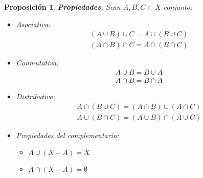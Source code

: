 \documentclass[10pt, a4paper]{article}
\theoremstyle{theorem-style}
\newtheorem{nprop}{Proposición}[section]
\theoremstyle{definition-style}
\theoremstyle{remark-style}
\theoremstyle{example-style}
\theoremstyle{definition-style}
\theoremstyle{remark-style}
\begin{document}
\begin{nprop}
\textbf{Propiedades.}
Sean $A,B,C\subset X$ conjunto:
\begin{itemize}
\item Asociativa:
\begin{equation}
\begin{split}
(A\cup B)\cup C = A\cup (B\cup C) \\
(A\cap B) \cap C = A\cap (B\cap C)
\end{split}
\end{equation}
\item Conmutativa:
\begin{equation}
\begin{split}
A\cup B = B\cup A \\
A\cap B = B\cap A
\end{split}
\end{equation}
\item Distributiva:
\begin{equation}
\begin{split}
A\cap(B\cup C) = (A\cap B)\cup (A\cap C) \\
A\cup (B\cap C) = (A\cup B)\cap (A\cup C)
\end{split}
\end{equation}
\item Propiedades del complementario:
\begin{itemize}
\item $A\cup (X-A) = X$
\item $A\cap (X-A) = \emptyset$
\end{itemize}
\end{itemize}
\end{nprop}
\end{document}
